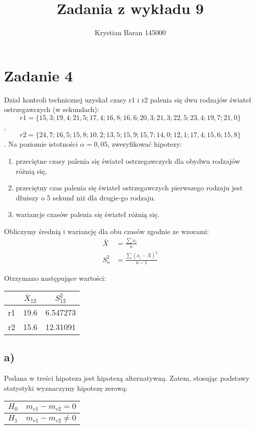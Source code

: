\documentclass{article}
\author{Krystian Baran 145000}
\title{Zadania z wykładu 9}
\begin{document}
\maketitle
\newpage

\tableofcontents
\newpage

\section{Zadanie 4}
Dział kontroli technicznej uzyskał czasy r1 i r2 palenia się dwu rodzajów świateł ostrzegawczych (w sekundach):
\[ r1 = \{15,3; 19,4; 21,5; 17,4; 16,8; 16,6; 20,3; 21,3; 22,5; 23,4; 19,7; 21,0\} \],
\[ r2 = \{24,7; 16,5; 15,8; 10,2; 13,5; 15,9; 15,7; 14,0; 12,1; 17,4; 15,6; 15,8\}\].
Na poziomie istotności $\alpha = 0,05$, zweryfikować hipotezy:
\begin{enumerate}[label = \alph*)]
\item przeciętne czasy palenia się świateł ostrzegawczych dla obydwu rodzajów różnią się,
\item przeciętny czas palenia się świateł ostrzegawczych pierwszego rodzaju jest dłuższy o 5 sekund niż dla drugie-go rodzaju.
\item wariancje czasów palenia się świateł różnią się.
\end{enumerate}

Obliczymy średnią i wariancję dla obu czasów zgodnie ze wzorami:
\begin{align*}
\overline{X} & = \frac{\sum x_i}{n} \\
S_n^2 &= \frac{\sum (x_i - \overline{X})^2 }{n-1}
\end{align*}

Otrzymano następujące wartości:
\begin{center} \begin{tabular}{|c|c|c|} \hline
 & $\overline{X}_{12}$ & $S_{12}^2$ \\ \hline
r1 & 19.6 & 6.547273 \\ \hline
r2 & 15.6 & 12.31091 \\ \hline
\end{tabular} \end{center}

\subsection{a)}
Podana w treści hipoteza jest hipotezą alternatywną. Zatem, stosując podstawy statystyki wyznaczymy hipotezę zerową:
\begin{center} \begin{tabular}{|c|c|} \hline
$H_0$ & $m_{r1} - m_{r2} = 0$ \\ \hline
$H_1$ & $m_{r1} - m_{r2} \neq 0$ \\ \hline
\end{tabular} \end{center}
\end{document}
